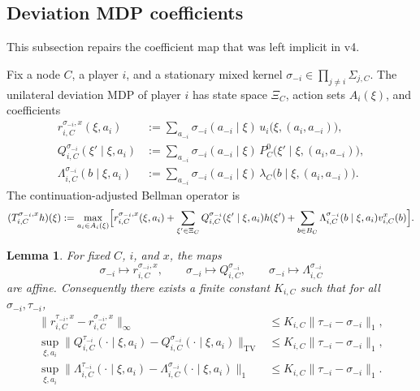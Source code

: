 \documentclass[12pt]{article}
\newtheorem{lemma}[theorem]{Lemma}
\theoremstyle{definition}
\newcommand{\1}{\mathbf{1}}
\begin{document}
\subsection{Deviation MDP coefficients}

This subsection repairs the coefficient map that was left implicit in v4.

Fix a node $C$, a player $i$, and a stationary mixed kernel
$\sigma_{-i}\in \prod_{j\ne i}\Sigma_{j,C}$.  The unilateral deviation MDP of
player $i$ has state space $\Xi_C$, action sets $A_i(\xi)$, and coefficients
\begin{align}
\label{eq:r-sigma}
r_{i,C}^{\sigma_{-i},x}(\xi,a_i)
&:=
\sum_{a_{-i}}\sigma_{-i}(a_{-i}\mid\xi)
\,u_i\bigl(\xi,(a_i,a_{-i})\bigr),
\\
\label{eq:Q-sigma}
Q_{i,C}^{\sigma_{-i}}(\xi'\mid \xi,a_i)
&:=
\sum_{a_{-i}}\sigma_{-i}(a_{-i}\mid\xi)
\,P_C^0\bigl(\xi'\mid\xi,(a_i,a_{-i})\bigr),
\\
\label{eq:q-exit-sigma}
\Lambda_{i,C}^{\sigma_{-i}}(b\mid\xi,a_i)
&:=
\sum_{a_{-i}}\sigma_{-i}(a_{-i}\mid\xi)
\,\lambda_C\bigl(b\mid\xi,(a_i,a_{-i})\bigr).
\end{align}
The continuation-adjusted Bellman operator is
\begin{equation}
\label{eq:Bellman-operator}
(T_{i,C}^{\sigma_{-i},x}h)(\xi)
:=
\max_{a_i\in A_i(\xi)}\Bigl[
 r_{i,C}^{\sigma_{-i},x}(\xi,a_i)
 +\sum_{\xi'\in\Xi_C}Q_{i,C}^{\sigma_{-i}}(\xi'\mid\xi,a_i)h(\xi')
 +\sum_{b\in B_C}\Lambda_{i,C}^{\sigma_{-i}}(b\mid\xi,a_i)v_{i,C}^x(b)
 \Bigr].
\end{equation}

\begin{lemma}
\label{lem:coeff-affine}
For fixed $C$, $i$, and $x$, the maps
\[
\sigma_{-i}\mapsto r_{i,C}^{\sigma_{-i},x},
\qquad
\sigma_{-i}\mapsto Q_{i,C}^{\sigma_{-i}},
\qquad
\sigma_{-i}\mapsto \Lambda_{i,C}^{\sigma_{-i}}
\]
are affine.  Consequently there exists a finite constant $K_{i,C}$ such that for
all $\sigma_{-i},\tau_{-i}$,
\begin{align}
\|r_{i,C}^{\tau_{-i},x}-r_{i,C}^{\sigma_{-i},x}\|_\infty
&\le K_{i,C}\|\tau_{-i}-\sigma_{-i}\|_1,
\label{eq:r-lip}
\\
\sup_{\xi,a_i}\|Q_{i,C}^{\tau_{-i}}(\cdot\mid\xi,a_i)-Q_{i,C}^{\sigma_{-i}}(\cdot\mid\xi,a_i)\|_{\mathrm{TV}}
&\le K_{i,C}\|\tau_{-i}-\sigma_{-i}\|_1,
\label{eq:Q-lip}
\\
\sup_{\xi,a_i}\|\Lambda_{i,C}^{\tau_{-i}}(\cdot\mid\xi,a_i)-\Lambda_{i,C}^{\sigma_{-i}}(\cdot\mid\xi,a_i)\|_{1}
&\le K_{i,C}\|\tau_{-i}-\sigma_{-i}\|_1.
\label{eq:Lambda-lip}
\end{align}
\end{lemma}
\end{document}
